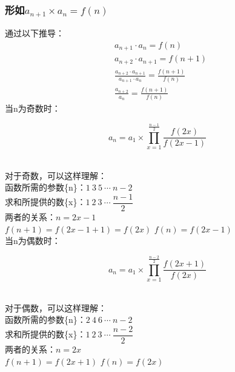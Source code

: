 \documentclass[UTF8]{ctexart}
\begin{document}
\subsubsection{形如{\large$a_{n+1}\times a_{n}=f(n)$}}
    通过以下推导：
    \setcounter{equation}{0}
    \begin{align}
        &a_{n+1}\cdot a_{n}=f(n)\\[3mm]
        &a_{n+2}\cdot a_{n+1}=f(n+1)\\[5mm]
        &\frac{a_{n+2}\cdot a_{n+1}}{a_{n+1}\cdot a_n}=\frac{f(n+1)}{f(n)}\\[3mm]
        &\frac{a_{n+2}}{a_n}=\frac{f(n+1)}{f(n)}
    \end{align}
    当n为奇数时：
    \begin{large}
    \begin{equation*}
        a_n=a_1\times\prod_{x=1}^{\frac{n-1}{2}}\frac{f(2x)}{f(2x-1)}
    \end{equation*}
    \end{large}\\
    对于奇数，可以这样理解：\\[3mm]
    函数所需的参数\{n\}：$1~3~5~\cdots~n-2$\\[3mm]
    求和所提供的数\{x\}：$1~2~3~\cdots~\dfrac{n-1}{2}$\\[3mm]
    两者的关系：$n=2x-1$\\[3mm]
    $f(n+1)=f(2x-1+1)=f(2x)$\qquad
    $f(n)=f(2x-1)$\\[6mm]
    当n为偶数时：
    \begin{large}
    \begin{equation*}
        a_n=a_1\times\prod_{x=1}^{\frac{n-2}{2}}\frac{f(2x+1)}{f(2x)}
    \end{equation*}
    \end{large}\\
    对于偶数，可以这样理解：\\[3mm]
    函数所需的参数\{n\}：$2~4~6~\cdots~n-2$\\[3mm]
    求和所提供的数\{x\}：$1~2~3~\cdots~\dfrac{n-2}{2}$\\[3mm]
    两者的关系：$n=2x$\\[3mm]
    $f(n+1)=f(2x+1)$\qquad
    $f(n)=f(2x)$

\newpage
\end{document}
